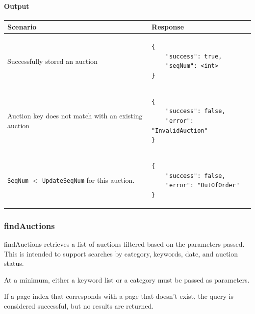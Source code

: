 \documentclass[12pt,a4paper]{article}
\begin{document}
\paragraph{Output}
\begin{center}
    \begin{tabular}{| p{6cm} | l |}
        \hline
        \textbf{Scenario} & \textbf{Response} \\
        \hline
        Successfully stored an auction & 
        \begin{lstlisting}[language=tableJson,firstnumber=1]
{
    "success": true,
    "seqNum": <int>           
}

        \end{lstlisting} \\ 
        \hline
        Auction key does not match with an existing auction & 
        \begin{lstlisting}[language=tableJson,firstnumber=1]
{
    "success": false,
    "error": "InvalidAuction"
}

        \end{lstlisting} \\ 
        \hline
        \texttt{SeqNum} $<$ \texttt{UpdateSeqNum} for this auction. & 
        \begin{lstlisting}[language=tableJson,firstnumber=1]
{
    "success": false,
    "error": "OutOfOrder"
}

        \end{lstlisting} \\ 
        \hline
    \end{tabular}
\end{center}





\pagebreak
\subsubsection{findAuctions}

findAuctions retrieves a list of auctions filtered based on the parameters passed.
This is intended to support searches by category, keywords, date, and auction status.

\vspace{\baselineskip}

At a minimum, either a keyword list or a category must be passed as parameters.

If a page index that corresponds with a page that doesn't exist, 
the query is considered successful, but no results are returned.
\end{document}
